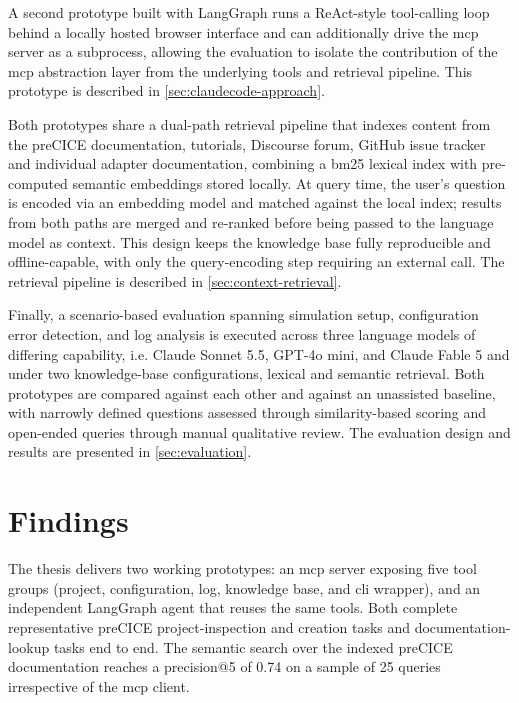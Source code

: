 \documentclass[
  numbers=noenddot,
  english,
  a4paper,
  twoside,
  bibliography=totoc,
  headsepline,
  cleardoublepage=empty,
  parskip=half,
  draft=false
]{scrbook}
\theoremstyle{break}
\renewcommand{\_}{\textunderscore\allowbreak}
\begin{document}
A second prototype built with LangGraph runs a ReAct-style tool-calling loop behind a locally
hosted browser interface and can additionally drive the \gls{mcp} server as a subprocess,
allowing the evaluation to isolate the contribution of the \gls{mcp} abstraction layer from the
underlying tools and retrieval pipeline.
This prototype is described in \cref{sec:claudecode-approach}.

Both prototypes share a dual-path retrieval pipeline that indexes content from the preCICE
documentation, tutorials, Discourse forum, GitHub issue tracker and individual adapter documentation, combining a \gls{bm25}
lexical index with pre-computed semantic embeddings stored locally.
At query time, the user's question is encoded via an embedding model
and matched against the local index; results from both paths are merged and re-ranked before
being passed to the language model as context.
This design keeps the knowledge base fully reproducible and offline-capable, with only the
query-encoding step requiring an external call.
The retrieval pipeline is described in \cref{sec:context-retrieval}.

Finally, a scenario-based evaluation spanning simulation setup, configuration error detection,
and log analysis is executed across three language models of differing capability, i.e. Claude
Sonnet 5.5, GPT-4o mini, and Claude Fable 5 and under two knowledge-base configurations,
lexical and semantic retrieval.
Both prototypes are compared against each other and against an unassisted baseline, with
narrowly defined questions assessed through similarity-based scoring and open-ended queries
through manual qualitative review.
The evaluation design and results are presented in \cref{sec:evaluation}.


\section{Findings}\label{sec:introduction:results}

The thesis delivers two working prototypes: an \gls{mcp} server exposing five tool groups
(project, configuration, log, knowledge base, and \gls{cli} wrapper), and an independent
LangGraph agent that reuses the same tools.
Both complete representative preCICE project-inspection and creation tasks and documentation-lookup tasks end to end. 
The semantic search over the indexed preCICE documentation reaches a precision@5 of 0.74
on a sample of 25 queries irrespective of the \gls{mcp} client.
\end{document}
